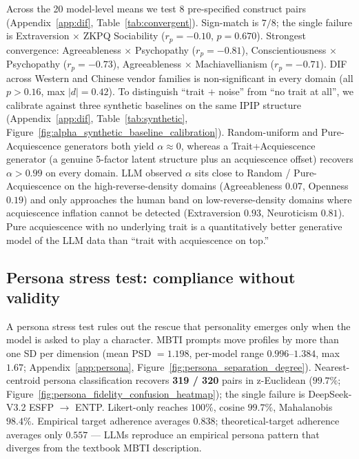 \documentclass{article}
\begin{document}
Across the 20 model-level means we test 8 pre-specified construct pairs (Appendix~\ref{app:dif}, Table~\ref{tab:convergent}). Sign-match is $7/8$; the single failure is Extraversion $\times$ ZKPQ Sociability ($r_p = -0.10$, $p = 0.670$). Strongest convergence: Agreeableness $\times$ Psychopathy ($r_p = -0.81$), Conscientiousness $\times$ Psychopathy ($r_p = -0.73$), Agreeableness $\times$ Machiavellianism ($r_p = -0.71$). DIF across Western and Chinese vendor families is non-significant in every domain (all $p > 0.16$, max $|d| = 0.42$). To distinguish ``trait $+$ noise'' from ``no trait at all'', we calibrate against three synthetic baselines on the same IPIP structure (Appendix~\ref{app:dif}, Table~\ref{tab:synthetic}, Figure~\ref{fig:alpha_synthetic_baseline_calibration}). Random-uniform and Pure-Acquiescence generators both yield $\alpha \approx 0$, whereas a Trait+Acquiescence generator (a genuine 5-factor latent structure plus an acquiescence offset) recovers $\alpha > 0.99$ on every domain. LLM observed $\alpha$ sits close to Random / Pure-Acquiescence on the high-reverse-density domains (Agreeableness $0.07$, Openness $0.19$) and only approaches the human band on low-reverse-density domains where acquiescence inflation cannot be detected (Extraversion $0.93$, Neuroticism $0.81$). Pure acquiescence with no underlying trait is a quantitatively better generative model of the LLM data than ``trait with acquiescence on top.''

\subsection{Persona stress test: compliance without validity}
\label{sec:results-persona}

A persona stress test rules out the rescue that personality emerges only when the model is asked to play a character. MBTI prompts move profiles by more than one SD per dimension (mean PSD $= 1.198$, per-model range $0.996$--$1.384$, max $1.67$; Appendix~\ref{app:persona}, Figure~\ref{fig:persona_separation_degree}). Nearest-centroid persona classification recovers \textbf{319 / 320} pairs in z-Euclidean ($99.7\%$; Figure~\ref{fig:persona_fidelity_confusion_heatmap}); the single failure is DeepSeek-V3.2 ESFP $\to$ ENTP. Likert-only reaches $100\%$, cosine $99.7\%$, Mahalanobis $98.4\%$. Empirical target adherence averages $0.838$; theoretical-target adherence averages only $0.557$ --- LLMs reproduce an empirical persona pattern that diverges from the textbook MBTI description.
\end{document}
